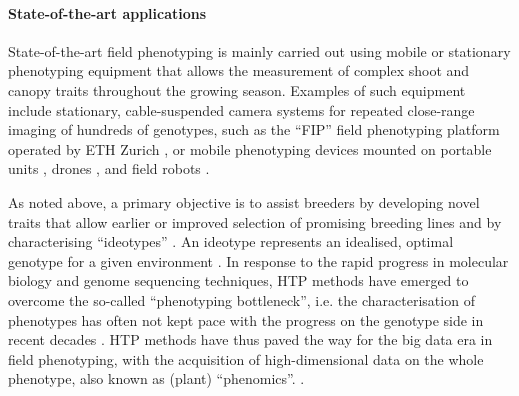 \paragraph{State-of-the-art applications}
State-of-the-art field phenotyping is mainly carried out using mobile or stationary phenotyping equipment that allows the measurement of complex shoot and canopy traits throughout the growing season. Examples of such equipment include stationary, cable-suspended camera systems for repeated close-range imaging of hundreds of genotypes, such as the ``FIP'' field phenotyping platform operated by ETH Zurich \citep{kirchgessner_eth_2017}, or mobile phenotyping devices mounted on portable units \citep{crain_development_2016}, drones \citep{walter_advances_2022}, and field robots \citep{xu_review_2022}.

As noted above, a primary objective is to assist breeders by developing novel traits that allow earlier or improved selection of promising breeding lines \cite{watt_phenotyping_2020} and by characterising ``ideotypes'' \citep{roth_high-throughput_2022}. An ideotype represents an idealised, optimal genotype for a given environment \citep{donald_breeding_1968}. In response to the rapid progress in molecular biology and genome sequencing techniques, \gls{HTP} methods have emerged to overcome the so-called ``phenotyping bottleneck'', i.e. the characterisation of phenotypes has often not kept pace with the progress on the genotype side in recent decades \citep{araus_translating_2018, yang_crop_2020, song_high-throughput_2021}. \gls{HTP} methods have thus paved the way for the big data era in field phenotyping, with the acquisition of high-dimensional data on the whole phenotype, also known as (plant) ``phenomics''. \citep{houle_phenomics_2010}.


